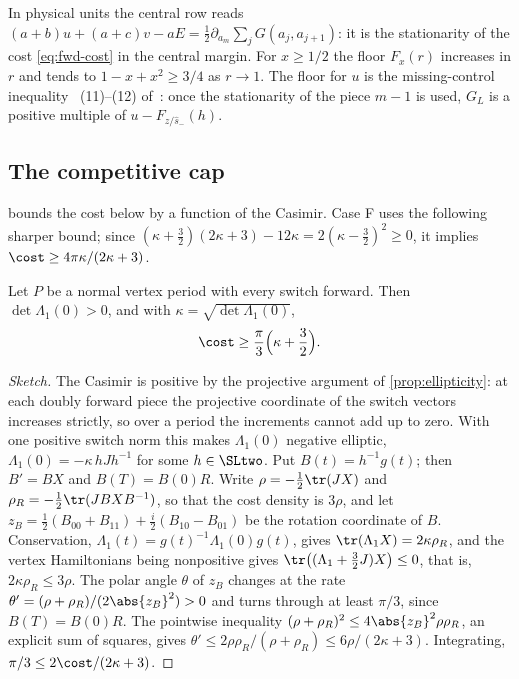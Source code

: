 In physical units the central row reads $(a+b)u+(a+c)v-aE=\frac12\partial_{a_m}\sum_jG(a_j,a_{j+1})$:
it is the stationarity of the cost \eqref{eq:fwd-cost} in the central margin. For $x\ge1/2$ the
floor $F_x(r)$ increases in $r$ and tends to $1-x+x^2\ge3/4$ as $r\to1$. The floor for $u$ is the
missing-control inequality ~(11)--(12)
of~\cite{Notes}: once the stationarity of the piece $m-1$ is used, $G_L$ is a positive multiple of
$u-F_{z/\hat s_-}(h)$.

\subsection{The competitive cap}

 bounds the cost below by a function of the Casimir. Case F uses the
following sharper bound; since $(\kappa+\frac32)(2\kappa+3)-12\kappa=2(\kappa-\frac32)^2\ge0$, it
implies $\cost\ge4\pi\kappa/(2\kappa+3)$.

\begin{proposition}\label{prop:fwd-spectral}
Let $P$ be a normal vertex period with every switch forward. Then $\det\Lambda_1(0)>0$, and with
$\kappa=\sqrt{\det\Lambda_1(0)}$,
\[
\cost\ge\frac\pi3\Bigl(\kappa+\frac32\Bigr).
\]
\end{proposition}

\begin{proof}[Sketch]
The Casimir is positive by the projective argument of \cref{prop:ellipticity}: at each doubly
forward piece the projective coordinate of the switch vectors increases strictly, so over a period
the increments cannot add up to zero. With one
positive switch norm this makes $\Lambda_1(0)$ negative elliptic, $\Lambda_1(0)=-\kappa\,hJh^{-1}$
for some $h\in\SLtwo$. Put $B(t)=h^{-1}g(t)$; then $B'=BX$ and $B(T)=B(0)R$. Write
$\rho=-\frac12\tr(JX)$ and $\rho_R=-\frac12\tr(JBXB^{-1})$, so that the cost density is $3\rho$, and
let $z_B=\frac12(B_{00}+B_{11})+\frac i2(B_{10}-B_{01})$ be the rotation coordinate of $B$.
Conservation, $\Lambda_1(t)=g(t)^{-1}\Lambda_1(0)g(t)$, gives $\tr(\Lambda_1X)=2\kappa\rho_R$, and
the vertex Hamiltonians being nonpositive gives $\tr\bigl((\Lambda_1+\frac32J)X\bigr)\le0$, that
is, $2\kappa\rho_R\le3\rho$. The polar angle $\theta$ of $z_B$ changes at the rate
$\theta'=(\rho+\rho_R)/(2\abs{z_B}^2)>0$ and turns through at least $\pi/3$, since $B(T)=B(0)R$.
The pointwise inequality $(\rho+\rho_R)^2\le4\abs{z_B}^2\rho\rho_R$, an explicit sum of squares,
gives $\theta'\le2\rho\rho_R/(\rho+\rho_R)\le6\rho/(2\kappa+3)$. Integrating,
$\pi/3\le2\cost/(2\kappa+3)$.
\end{proof}

